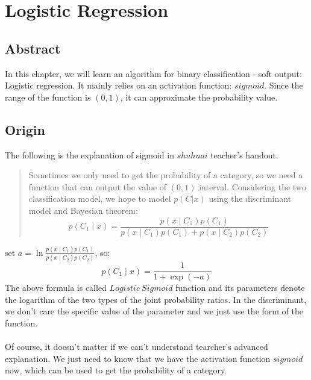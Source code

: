 \documentclass{report}
\begin{document}
\chapter{Logistic Regression}
\section{Abstract}
In this chapter, we will learn an algorithm for binary classification - soft output: Logistic regression. It mainly relies on an activation function: $sigmoid$. Since the range of the function is $(0,1)$, it can approximate the probability value.
\section{Origin}
The following is the explanation of sigmoid in $shuhuai$ teacher's handout.
\begin{quotation}
	Sometimes we only need to get the probability of a category, so we need a function that can output the value of $(0, 1)$ interval. Considering the two classification model, we hope to model $p(C|x)$ using the discriminant model and Bayesian theorem: $$p\left(C_{1} \mid x\right)=\frac{p\left(x \mid C_{1}\right) p\left(C_{1}\right)}{p\left(x \mid C_{1}\right) p\left(C_{1}\right)+p\left(x \mid C_{2}\right) p\left(C_{2}\right)}$$
\end{quotation}
set $a=\ln \frac{p\left(x \mid C_{1}\right) p\left(C_{1}\right)}{p\left(x \mid C_{2}\right) p\left(C_{2}\right)}$, so:
$$
p\left(C_{1} \mid x\right)=\frac{1}{1+\exp (-a)}
$$
The above formula is called $Logistic\ Sigmoid$ function and its parameters denote the logarithm of the two types of the joint probability ratios. In the discriminant, we don't care the specific value of the parameter and we just use the form of the function.\\\\
Of course, it doesn't matter if we can't understand tearcher's advanced explanation. We just need to know that we have the activation function $sigmoid$ now, which can be used to get the probability of a category.
\end{document}
